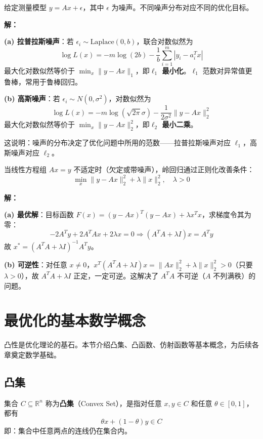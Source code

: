 \begin{example}[噪声模型与极大似然估计]\label{ex:mle-noise}
给定测量模型 $y = Ax + \epsilon$，其中 $\epsilon$ 为噪声。不同噪声分布对应不同的优化目标。

\textbf{解：}

\textbf{(a) 拉普拉斯噪声}：若 $\epsilon_i \sim \text{Laplace}(0, b)$，联合对数似然为
\[
\log L(x) = -m \log(2b) - \frac{1}{b}\sum_{i=1}^m |y_i - a_i^T x|
\]
最大化对数似然等价于 $\min_x \|y - Ax\|_1$，即\textbf{$\ell_1$ 最小化}。$\ell_1$ 范数对异常值更鲁棒，常用于鲁棒回归。

\textbf{(b) 高斯噪声}：若 $\epsilon_i \sim N(0, \sigma^2)$，对数似然为
\[
\log L(x) = -m \log(\sqrt{2\pi}\sigma) - \frac{1}{2\sigma^2}\|y - Ax\|_2^2
\]
最大化对数似然等价于 $\min_x \|y - Ax\|_2^2$，即\textbf{$\ell_2$ 最小二乘}。

这说明：噪声的分布决定了优化问题中所用的范数——拉普拉斯噪声对应 $\ell_1$，高斯噪声对应 $\ell_2$。
\end{example}

\begin{example}\label{ex:ridge}
当线性方程组 $Ax = y$ 不适定时（欠定或带噪声），岭回归通过正则化改善条件：
\[
\min_x \|y - Ax\|_2^2 + \lambda \|x\|_2^2, \quad \lambda > 0
\]

\textbf{解：}

\textbf{(a) 最优解}：目标函数 $F(x) = (y - Ax)^T(y - Ax) + \lambda x^T x$，求梯度令其为零：
\[
-2A^T y + 2A^T A x + 2\lambda x = 0 \Rightarrow (A^T A + \lambda I)x = A^T y
\]
故 $x^* = (A^T A + \lambda I)^{-1} A^T y$。

\textbf{(b) 可逆性}：对任意 $x \neq 0$，$x^T(A^T A + \lambda I)x = \|Ax\|_2^2 + \lambda \|x\|_2^2 > 0$（只要 $\lambda > 0$），故 $A^T A + \lambda I$ 正定，一定可逆。这解决了 $A^T A$ 不可逆（$A$ 不列满秩）的问题。
\end{example}

\section{最优化的基本数学概念}\label{sec:math-prelim}

凸性是优化理论的基石。本节介绍凸集、凸函数、仿射函数等基本概念，为后续各章奠定数学基础。

\subsection{凸集}

\begin{definition}[凸集]
集合 $C \subseteq \mathbb{R}^n$ 称为\textbf{凸集}（Convex Set），是指对任意 $x, y \in C$ 和任意 $\theta \in [0,1]$，都有
\[
\theta x + (1-\theta) y \in C
\]
即：集合中任意两点的连线仍在集合内。
\end{definition}

